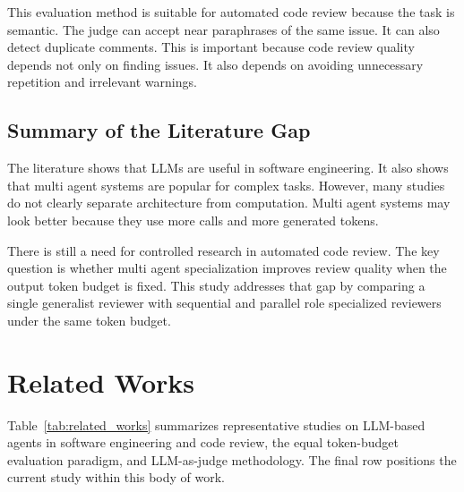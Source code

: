 \documentclass[pdflatex,sn-mathphys-num]{sn-jnl}
\theoremstyle{thmstyleone}
\theoremstyle{thmstyletwo}
\theoremstyle{thmstylethree}
\begin{document}
This evaluation method is suitable for automated code review because the task is semantic. The judge can accept near paraphrases of the same issue. It can also detect duplicate comments. This is important because code review quality depends not only on finding issues. It also depends on avoiding unnecessary repetition and irrelevant warnings.

\subsection{Summary of the Literature Gap}

The literature shows that LLMs are useful in software engineering. It also shows that multi agent systems are popular for complex tasks. However, many studies do not clearly separate architecture from computation. Multi agent systems may look better because they use more calls and more generated tokens.

There is still a need for controlled research in automated code review. The key question is whether multi agent specialization improves review quality when the output token budget is fixed. This study addresses that gap by comparing a single generalist reviewer with sequential and parallel role specialized reviewers under the same token budget.

\section{Related Works}\label{sec:related_works}

Table~\ref{tab:related_works} summarizes representative studies on LLM-based agents in software engineering and code review, the equal token-budget evaluation paradigm, and LLM-as-judge methodology. The final row positions the current study within this body of work.
\end{document}
